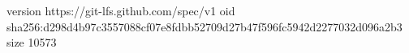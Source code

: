 version https://git-lfs.github.com/spec/v1
oid sha256:d298d4b97c3557088cf07e8fdbb52709d27b47f596fc5942d2277032d096a2b3
size 10573
